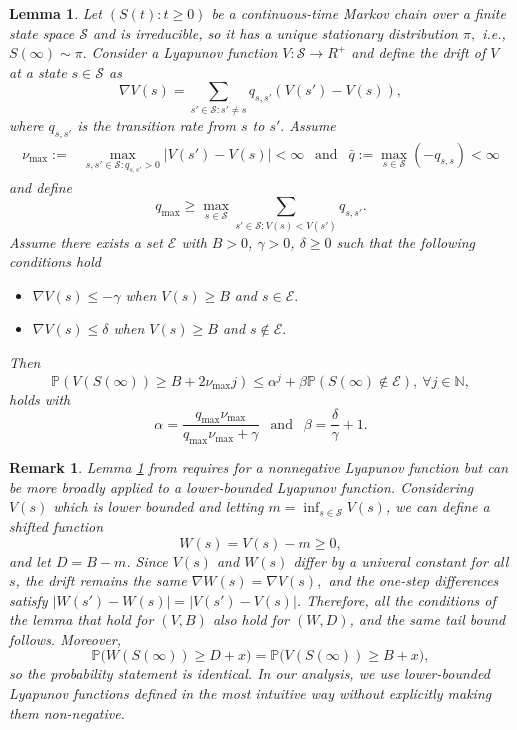 \documentclass[11pt,oneside,letter]{article}
\newtheorem{lemma}{Lemma}
\newtheorem{remark}{Remark}
\begin{document}
\begin{lemma}\label{TailBound}
Let $(S(t): t \geq 0)$ be a continuous-time Markov chain over a finite state space $\mathcal S$ and is irreducible, so it has a unique stationary distribution $\pi,$ {i.e., $S(\infty) \sim \pi.$}  Consider a Lyapunov function $V: \mathcal S \to R^{+}$ and define the drift of $V$ at a state $s \in \mathcal S$ as $$\nabla V(s) = \sum_{s' \in \mathcal S: s' \neq s} q_{s,s'} (V(s') - V(s)),$$ where $q_{s,s'}$ is the transition rate from $s$ to $s'.$ Assume
\begin{align*} 
\nu_{\max} :=& \max\limits_{s,s'\in \mathcal S: q_{s,s'} >0} |V(s') - V(s)|< \infty ~~ \text{ and } ~~ \bar q := \max\limits_{s \in \mathcal S} (-q_{s,s}) < \infty 
\end{align*}
and define $$q_{\max}\geq \max\limits_{s \in \mathcal S} \sum_{s' \in \mathcal S: V(s) < V(s')} q_{s,s'}.$$
Assume there exists a set $\mathcal E$ with $B>0$, $\gamma>0$, $\delta \geq 0$ such that the following conditions hold
\begin{itemize}
\item $\nabla V(s) \leq -\gamma$ when $V(s) \geq B$ and $s \in \mathcal E.$
\item $\nabla V(s) \leq \delta$ when $V(s) \geq B$ and $s \notin \mathcal E.$
\end{itemize}
Then $$\mathbb P \left(V(S(\infty))\geq B + 2 \nu_{\max} j \right) \leq \alpha^j + \beta \mathbb P\left(S(\infty) \notin \mathcal E\right), ~ \forall j \in \mathbb{N},$$
holds with $$\alpha = \frac{q_{\max}\nu_{\max}}{q_{\max}\nu_{\max} + \gamma} ~~\text{ and }~~ \beta = \frac{\delta}{\gamma}+1.$$
\end{lemma}

{
\begin{remark}\label{remark:lya}
Lemma \ref{TailBound} from \cite{WanMagSri_21} requires for a nonnegative Lyapunov function but can be more broadly applied to a lower-bounded Lyapunov function. Considering $V(s)$ which is lower bounded and letting $m = \inf_{s\in\mathcal S} V(s)$, we can define a shifted function
$$
W(s) = V(s) - m \geq 0,
$$
and let $D = B - m$. Since $V(s)$ and $W(s)$ differ by a univeral constant for all $s$, the drift remains the same
$\nabla W(s) = \nabla V(s),$
and the one-step differences satisfy $|W(s')-W(s)| = |V(s')-V(s)|$. Therefore, all the conditions of the lemma that hold for $(V,B)$ also hold for $(W,D)$, and the same tail bound follows. Moreover,
$$
\mathbb{P}\big(W(S(\infty)) \geq D + x\big)
= \mathbb{P}\big(V(S(\infty)) \geq B + x\big),
$$
so the probability statement is identical. 
In our analysis, we use  lower-bounded Lyapunov functions defined in the most intuitive way without explicitly making them non-negative. 
\end{remark}
}
\end{document}
